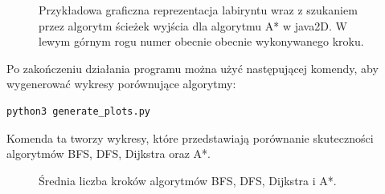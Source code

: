 \documentclass{article}
\begin{document}
\begin{figure}[H]
    \centering
    \caption{Przykładowa graficzna reprezentacja labiryntu wraz z szukaniem przez algorytm ścieżek wyjścia dla algorytmu A* w java2D. W lewym górnym rogu numer obecnie obecnie wykonywanego kroku.}
\end{figure}

Po zakończeniu działania programu można użyć następującej komendy, aby wygenerować wykresy porównujące algorytmy:

\begin{lstlisting}[caption=Generowanie wykresów]
python3 generate_plots.py
\end{lstlisting}

Komenda ta tworzy wykresy, które przedstawiają porównanie skuteczności algorytmów BFS, DFS, Dijkstra oraz A*. 

\begin{figure}[H]
    \centering
    \caption{Średnia liczba kroków algorytmów BFS, DFS, Dijkstra i A*.}
\end{figure}
\end{document}
